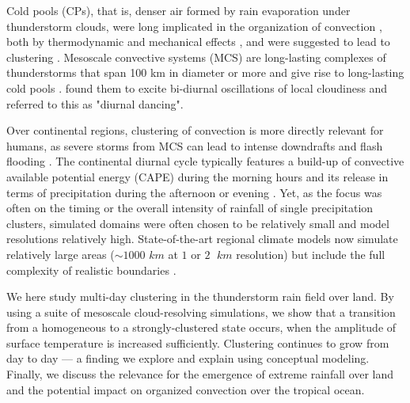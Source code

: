 \documentclass{article}
\begin{document}
Cold pools (CPs), that is, denser air formed by rain evaporation under thunderstorm clouds, were long implicated in the organization of convection \cite{Drogemeier1985,rotunno1988theory}, both by thermodynamic and mechanical effects \cite{tompkins2001organizationCold,schlemmer2015modifications,boing2012influence,boing2016object,feng2015mechanisms,moseley2016intensification}, and were suggested to lead to clustering \cite{haerter2018reconciling,lochbihler2019response}.
Mesoscale convective systems (MCS) are long-lasting complexes of thunderstorms that span 100 km in diameter or more and give rise to long-lasting cold pools \cite{moeng1995atmospheric}. 
\citeauthor{chen1997diurnal} \citeyear{chen1997diurnal} found them to excite bi-diurnal oscillations of local cloudiness and referred to this as "diurnal dancing".

Over continental regions, clustering of convection is more directly relevant for humans, as severe storms from MCS can lead to intense downdrafts and flash flooding
\cite{doswell2001severe,smith2001extreme,cintineo2013predictability}.
The continental diurnal cycle typically features a build-up of convective available potential energy (CAPE) during the morning hours and its release in terms of precipitation during the afternoon or evening \cite{yang2001diurnal,guichard2004modelling,brown2002large,petch2002impact,schlemmer2011diurnal,moseley2016intensification,haerter2018intensified}.
Yet, as the focus was often on the timing or the overall intensity of rainfall of single precipitation clusters, simulated domains were often chosen to be relatively small and model resolutions relatively high. 
State-of-the-art regional climate models now simulate relatively large areas ($\sim 1000$ $km$ at $1$ or $2$ $\;km$ resolution) but include the full complexity of realistic boundaries \cite{ban2015heavy,prein2017simulating,rasp2018variability}.

We here study multi-day clustering in the thunderstorm rain field over land. 
By using a suite of mesoscale cloud-resolving simulations, we show that a transition from a homogeneous to a strongly-clustered state occurs, when the amplitude of surface temperature is increased sufficiently. 
Clustering continues to grow from day to day --- a finding we explore and explain using conceptual modeling.
Finally, we discuss the relevance for the emergence of extreme rainfall over land and the potential impact on organized convection over the tropical ocean.
\end{document}
